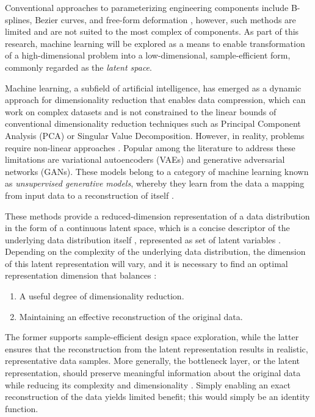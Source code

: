 \documentclass{article}
\begin{document}
 Conventional approaches to parameterizing engineering components include B-splines, Bezier curves, and free-form deformation \citep{Jabn2024}, however, such methods are limited and are not suited to the most complex of components. As part of this research, machine learning will be explored as a means to enable transformation of a high-dimensional problem into a low-dimensional, sample-efficient form, commonly regarded as the \textit{latent space}. 

Machine learning, a subfield of artificial intelligence, has emerged as a dynamic approach for dimensionality reduction that enables data compression, which can work on complex datasets and is not constrained to the linear bounds of conventional dimensionality reduction techniques such as Principal Component Analysis (PCA) \citep{Lew2021} or Singular Value Decomposition. However, in reality, problems require non-linear approaches \citep{Jabn2024}. Popular among the literature to address these limitations are variational autoencoders (VAEs) and generative adversarial networks (GANs). These models belong to a category of machine learning known as \textit{unsupervised generative models}, whereby they learn from the data a mapping from input data to a reconstruction of itself \citep{Lew2021}. 

These methods provide a reduced-dimension representation of a data distribution in the form of a continuous latent space, which is a concise descriptor of the underlying data distribution itself \citep{Zheng2023}, represented as set of latent variables \citep{Jabn2024}. Depending on the complexity of the underlying data distribution, the dimension of this latent representation will vary, and it is necessary to find an optimal representation dimension that balances \citep{Lew2021}: 

\begin{enumerate}
    \item A useful degree of dimensionality reduction.
    \item Maintaining an effective reconstruction of the original data.
\end{enumerate}

The former supports sample-efficient design space exploration, while the latter ensures that the reconstruction from the latent representation results in realistic, representative data samples. More generally, the bottleneck layer, or the latent representation, should preserve meaningful information about the original data while reducing its complexity and dimensionality \citep{Zheng2023}. Simply enabling an exact reconstruction of the data yields limited benefit; this would simply be an identity function. 
\end{document}
